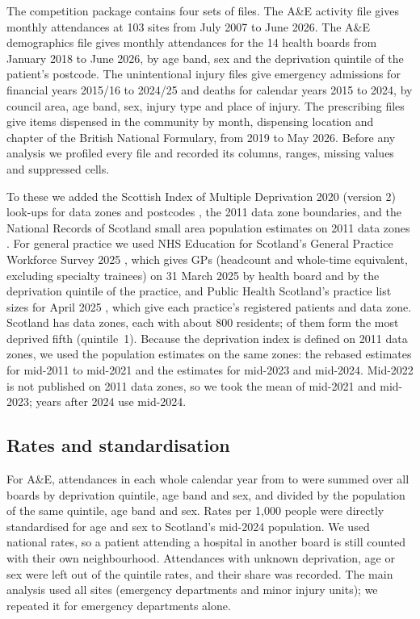 \documentclass[11pt,a4paper]{article}
\begin{document}
The competition package \citep{datalab2026} contains four sets of files. The A\&E activity file gives
monthly attendances at 103 sites from July 2007 to June 2026. The A\&E demographics file gives
monthly attendances for the 14 health boards from January 2018 to June 2026, by age band, sex and
the deprivation quintile of the patient's postcode. The unintentional injury files give emergency
admissions for financial years 2015/16 to 2024/25 and deaths for calendar years 2015 to 2024, by
council area, age band, sex, injury type and place of injury. The prescribing files give items
dispensed in the community by month, dispensing location and chapter of the British National
Formulary, from 2019 to May 2026. Before any analysis we profiled every file and recorded its
columns, ranges, missing values and suppressed cells.

To these we added the Scottish Index of Multiple Deprivation 2020 (version 2) look-ups for data
zones and postcodes \citep{simd2020}, the 2011 data zone boundaries, and the National Records of
Scotland small area population estimates on 2011 data zones \citep{nrssape}. For general practice
we used NHS Education for Scotland's General Practice Workforce Survey 2025 \citep{nesgpws2025},
which gives GPs (headcount and whole-time equivalent, excluding specialty trainees) on 31 March 2025
by health board and by the deprivation quintile of the practice, and Public Health Scotland's
practice list sizes for April 2025 \citep{phslistsizes2025}, which give each practice's registered
patients and data zone. Scotland has
\zonesTotal{} data zones, each with about 800 residents; \zonesQone{} of them form the most deprived
fifth (quintile~1). Because the deprivation index is defined on 2011 data zones, we used the
population estimates on the same zones: the rebased estimates for mid-2011 to mid-2021 and the
estimates for mid-2023 and mid-2024. Mid-2022 is not published on 2011 data zones, so we took the
mean of mid-2021 and mid-2023; years after 2024 use mid-2024.

\subsection{Rates and standardisation}

For A\&E, attendances in each whole calendar year from \aeFirstYear{} to \aeLastYear{} were summed
over all boards by deprivation quintile, age band and sex, and divided by the population of the same
quintile, age band and sex. Rates per 1{,}000 people were directly standardised for age and sex to
Scotland's mid-2024 population. We used national rates, so a patient attending a hospital in
another board is still counted with their own neighbourhood. Attendances with unknown deprivation,
age or sex were left out of the quintile rates, and their share was recorded. The main analysis used
all sites (emergency departments and minor injury units); we repeated it for emergency departments
alone.
\end{document}
